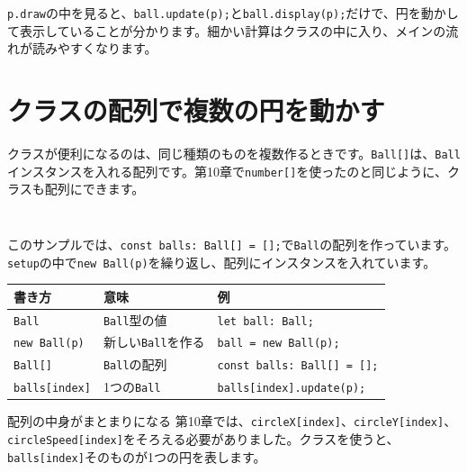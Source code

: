 \texttt{p.draw}の中を見ると、\texttt{ball.update(p);}と\texttt{ball.display(p);}だけで、円を動かして表示していることが分かります。細かい計算はクラスの中に入り、メインの流れが読みやすくなります。

\section{クラスの配列で複数の円を動かす}

クラスが便利になるのは、同じ種類のものを複数作るときです。\texttt{Ball[]}は、\texttt{Ball}インスタンスを入れる配列です。第10章で\texttt{number[]}を使ったのと同じように、クラスも配列にできます。

\begin{listing}[htbp]
\inputminted[firstline=1,lastline=36]{ts}{typescript-p5/listings/chapter11/ball-class-array.ts}
\caption{複数の円で使うBallクラス（\texttt{chapter11/ball-class-array.ts}）}
\label{lst:chapter11-ball-class-array-class}
\end{listing}

\begin{listing}[htbp]
\inputminted[firstline=38,lastline=63]{ts}{typescript-p5/listings/chapter11/ball-class-array.ts}
\caption{Ballクラスの配列で複数の円を動かす（\texttt{chapter11/ball-class-array.ts}）}
\label{lst:chapter11-ball-class-array-sketch}
\end{listing}

このサンプルでは、\texttt{const balls: Ball[] = [];}で\texttt{Ball}の配列を作っています。\texttt{setup}の中で\texttt{new Ball(p)}を繰り返し、配列にインスタンスを入れています。

\begin{center}
\begin{tabular}{lll}
\toprule
書き方 & 意味 & 例 \\
\midrule
\texttt{Ball} & \texttt{Ball}型の値 & \texttt{let ball: Ball;} \\
\texttt{new Ball(p)} & 新しい\texttt{Ball}を作る & \texttt{ball = new Ball(p);} \\
\texttt{Ball[]} & \texttt{Ball}の配列 & \texttt{const balls: Ball[] = [];} \\
\texttt{balls[index]} & 1つの\texttt{Ball} & \texttt{balls[index].update(p);} \\
\bottomrule
\end{tabular}
\end{center}

\begin{pointbox}{配列の中身がまとまりになる}
第10章では、\texttt{circleX[index]}、\texttt{circleY[index]}、\texttt{circleSpeed[index]}をそろえる必要がありました。クラスを使うと、\texttt{balls[index]}そのものが1つの円を表します。
\end{pointbox}

